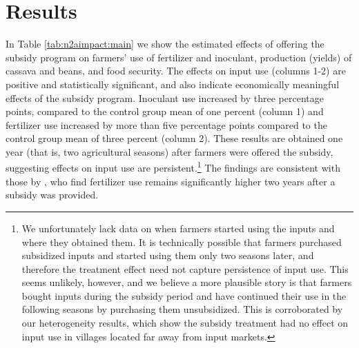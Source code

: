 \section{Results}
In Table \ref{tab:n2aimpact:main} we show the estimated effects of offering the subsidy program on farmers’ use of fertilizer and inoculant, production (yields) of cassava and beans, and food security. The effects on input use (columns 1-2) are positive and statistically significant, and also indicate economically meaningful effects of the subsidy program. Inoculant use increased by three percentage points, compared to the control group mean of one percent (column 1) and fertilizer use increased by more than five percentage points compared to the control group mean of three percent (column 2). These results are obtained one year (that is, two agricultural seasons) after farmers were offered the subsidy, suggesting effects on input use are persistent.\footnote{We unfortunately lack data on when farmers started using the inputs and where they obtained them. It is technically possible that farmers purchased subsidized inputs and started using them only two seasons later, and therefore the treatment effect need not capture persistence of input use. This seems unlikely, however, and we believe a more plausible story is that farmers bought inputs during the subsidy period and have continued their use in the following seasons by purchasing them unsubsidized. This is corroborated by our heterogeneity results, which show the subsidy treatment had no effect on input use in villages located far away from input markets.} The findings are consistent with those by \cite{Carter2014}, who find fertilizer use remains significantly higher two years after a subsidy was provided. 



